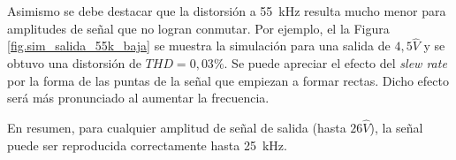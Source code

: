 

Asimismo se debe destacar que la distorsión a \SI{55}{\kilo\hertz} resulta mucho menor para amplitudes de señal que no logran conmutar. Por ejemplo, el la Figura \ref{fig.sim_salida_55k_baja} se muestra la simulación para una salida de $4,5\hat{V}$ y se obtuvo una distorsión de $THD=0,03\%$. Se puede apreciar el efecto del \textit{slew rate} por la forma de las puntas de la señal que empiezan a formar rectas. Dicho efecto será más pronunciado al aumentar la frecuencia.



En resumen, para cualquier amplitud de señal de salida (hasta $26\hat{V}$), la señal puede ser reproducida correctamente hasta \SI{25}{\kilo\hertz}.

